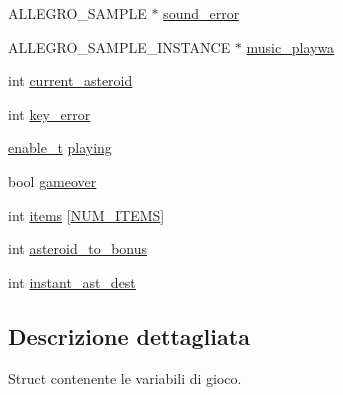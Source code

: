 \begin{DoxyCompactItemize}
\item 
A\+L\+L\+E\+G\+R\+O\+\_\+\+S\+A\+M\+P\+LE $\ast$ \hyperlink{structmatch__vars__t_a76f812bd8ea550d3e61ebfa185c3471a}{sound\+\_\+error}
\item 
A\+L\+L\+E\+G\+R\+O\+\_\+\+S\+A\+M\+P\+L\+E\+\_\+\+I\+N\+S\+T\+A\+N\+CE $\ast$ \hyperlink{structmatch__vars__t_a1565ecf6c28c18912372ef685ec9627f}{music\+\_\+playwa}
\item 
int \hyperlink{structmatch__vars__t_aec99582de5c65954b0cf568f1d702427}{current\+\_\+asteroid}
\item 
int \hyperlink{structmatch__vars__t_ab682954df4b3c57c0808d1f0975134ae}{key\+\_\+error}
\item 
\hyperlink{data_8h_a56839c56ca6deb3cff5e21540ddb8218}{enable\+\_\+t} \hyperlink{structmatch__vars__t_a726fe4ae3e07b478c2753115e71030f0}{playing}
\item 
bool \hyperlink{structmatch__vars__t_a2d403d1bd9faac481e4508b771b8ba69}{gameover}
\item 
int \hyperlink{structmatch__vars__t_a888b72765ff70c20f1d7980a00f3603c}{items} \mbox{[}\hyperlink{data_8h_affced4b175e803df59f802e25d017b9b}{N\+U\+M\+\_\+\+I\+T\+E\+MS}\mbox{]}
\item 
int \hyperlink{structmatch__vars__t_a2775d451ad359f3296dbfa36da5cca82}{asteroid\+\_\+to\+\_\+bonus}
\item 
int \hyperlink{structmatch__vars__t_a6d48827959334e36fca668b19fe1fe77}{instant\+\_\+ast\+\_\+dest}
\end{DoxyCompactItemize}


\subsection{Descrizione dettagliata}
Struct contenente le variabili di gioco. 

